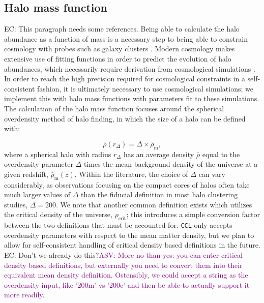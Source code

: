 \documentclass[\docopts]{\docclass}
\newcommand{\asv}[1]{\textcolor{purple}{ASV: #1}}
\newcommand{\elisa}[1]{\textcolor{green!10!orange!90!}{EC: #1}}
\newcommand{\ccl}{{\tt CCL}\xspace}
\begin{document}
\subsection{Halo mass function}

\elisa{This paragraph needs some references.} Being able to calculate the halo abundance as a function of mass is a necessary step to being able to constrain cosmology with probes such as galaxy clusters \cite{Paranjape2014}. Modern cosmology makes extensive use of fitting functions in order to predict the evolution of halo abundances, which necessarily require derivation from cosmological simulations \cite{Tinker2008, Tinker2010, Angulo2012}. In order to reach the high precision required for cosmological constraints in a self-consistent fashion, it is ultimately necessary to use cosmological simulations; we implement this with halo mass functions with parameters fit to these simulations. The calculation of the halo mass function focuses around the spherical overdensity method of halo finding, in which the size of a halo can be defined with:

\begin{equation}
\bar{\rho}(r_{\Delta}) = \Delta \times \bar{\rho}_{\mathrm{m}},
\end{equation}
%
where a spherical halo with radius $r_{\Delta}$ has an average density $\bar{\rho}$ equal to the overdensity parameter $\Delta$ times the mean background density of the universe at a given redshift, $\bar\rho_{\mathrm{m}}(z)$. Within the literature, the choice of $\Delta$ can vary considerably, as observations focusing on the compact cores of halos often take much larger values of $\Delta$ than the fiducial definition in most halo clustering studies, $\Delta = 200$. We note that another common definition exists which utilizes the critical density of the universe, $\rho_{\mathrm{crit}}$; this introduces a simple conversion factor between the two definitions that must be accounted for. \ccl only accepts overdensity parameters with respect to the mean matter density, but we plan to allow for self-consistent handling of critical density based definitions in the future. \elisa{Don't we already do this?}\asv{More no than yes: you can enter critical density based definitions, but externally you need to convert them into their equivalent mean density definition. Ostensibly, we could accept a string as the overdensity input, like '200m' vs '200c' and then be able to actually support it more readily.}
\end{document}
